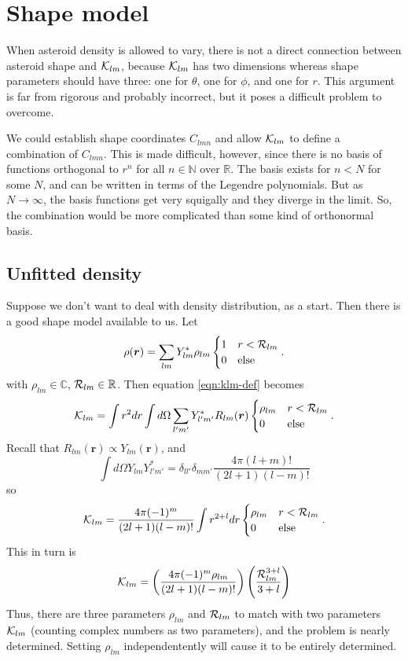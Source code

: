 \documentclass[aps,twocolumn,secnumarabic,balancelastpage,amsmath,amssymb,nofootinbib,floatfix]{revtex4-1}
\begin{document}
\section{Shape model}
When asteroid density is allowed to vary, there is not a direct connection between asteroid shape and $\mathcal{K}_{lm}$, because $\mathcal{K}_{lm}$ has two dimensions whereas shape parameters should have three: one for $\theta$, one for $\phi$, and one for $r$. This argument is far from rigorous and probably incorrect, but it poses a difficult problem to overcome.

We could establish shape coordinates $C_{lmn}$ and allow $\mathcal{K}_{lm}$ to define a combination of $C_{lmn}$. This is made difficult, however, since there is no basis of functions orthogonal to $r^n$ for all $n \in \mathbb{N}$ over $\mathbb{R}$. The basis exists for $n < N$ for some $N$, and can be written in terms of the Legendre polynomials. But as $N\rightarrow\infty$, the basis functions get very squigally and they diverge in the limit. So, the combination would be more complicated than some kind of orthonormal basis.


\subsection{Unfitted density}
Suppose we don't want to deal with density distribution, as a start. Then there is a good shape model available to us. Let
\begin{equation}
    \rho(\bm r) = \sum_{lm} Y_{lm}^* \rho_{lm} \begin{cases}
        1 & r < \mathcal{R}_{lm}\\
        0 & \text{else}
    \end{cases}.
\end{equation}
with $\rho_{lm} \in \mathbb{C}$, $\mathcal{R}_{lm} \in \mathbb{R}$. Then equation \ref{eqn:klm-def} becomes
\begin{equation*}
    \mathcal{K}_{lm} = \int r^2 dr \int d\Omega \sum_{l'm'} Y_{l'm'}^* R_{lm}(\bm r) \begin{cases}
        \rho_{lm} & r < \mathcal{R}_{lm}\\
        0 & \text{else}
    \end{cases}.
\end{equation*}
Recall that $R_{lm}(\bm r) \propto Y_{lm}(\bm r)$, and
$$\int d\Omega Y_{lm}Y^*_{l'm'} = \delta_{ll'}\delta_{mm'} \frac{4\pi (l+m)!}{(2l+1)(l-m)!}$$
so
\begin{equation*}
    \mathcal{K}_{lm} = \frac{4\pi (-1)^m }{(2l+1)(l-m)!} \int r^{2+l} dr \begin{cases}
        \rho_{lm} & r < \mathcal{R}_{lm}\\
        0 & \text{else}
    \end{cases}.
\end{equation*}
This in turn is
\begin{equation*}
    \mathcal{K}_{lm} = \left( \frac{4\pi (-1)^m \rho_{lm}}{(2l+1)(l-m)!} \right) \left( \frac{\mathcal{R}_{lm}^{3+l}}{3+l} \right)
\end{equation*}
Thus, there are three parameters $\rho_{lm}$ and $\mathcal{R}_{lm}$ to match with two parameters $\mathcal{K}_{lm}$ (counting complex numbers as two parameters), and the problem is nearly determined. Setting $\rho_{lm}$ independentently will cause it to be entirely determined.
\end{document}
